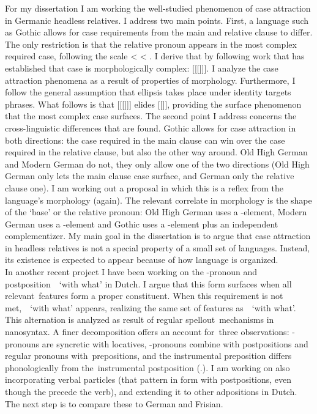 \documentclass[12pt]{article}
\begin{document}
For my dissertation I am working the well-studied phenomenon of case attraction in Germanic headless relatives. I address two main points. First, a language such as Gothic allows for case requirements from the main and relative clause to differ. The only restriction is that the relative pronoun appears in the most complex required case, following the scale  <  < . I derive that by following work that has established that case is morphologically complex: [[[]]]. I analyze the case attraction phenomena as a result of properties of morphology. Furthermore, I follow the general assumption that ellipsis takes place under identity targets phrases. What follows is that [[[]]] elides [[]], providing the surface phenomenon that the most complex case surfaces. The second point I address concerns the cross-linguistic differences that are found. Gothic allows for case attraction in both directions: the case required in the main clause can win over the case required in the relative clause, but also the other way around. Old High German and Modern German do not, they only allow one of the two directions (Old High German only lets the main clause case surface, and German only the relative clause one). I am working out a proposal in which this is a reflex from the language’s morphology (again). The relevant correlate in morphology is the shape of the ‘base’ or the relative pronoun: Old High German uses a -element, Modern German uses a -element and Gothic uses a -element plus an independent complementizer. My main goal in the dissertation is to argue that case attraction in headless relatives is not a special property of a small set of languages. Instead, its existence is expected to appear because of how language is organized.\\

In another recent project I have been working on the -pronoun and postposition  `with what’ in Dutch. I argue that this form surfaces when all relevant features form a proper constituent. When this requirement is not met,  `with what’ appears, realizing the same set of features as  `with what'. This alternation is analyzed as result of regular spellout mechanisms in nanosyntax. A finer decomposition offers an account for three observations: -pronouns are syncretic with locatives, -pronouns combine with postpositions and regular pronouns with prepositions, and the instrumental preposition differs phonologically from the instrumental postposition (.). I am working on also incorporating verbal particles (that pattern in form with postpositions, even though the precede the verb), and extending it to other adpositions in Dutch. The next step is to compare these to German and Frisian.\\
\end{document}
